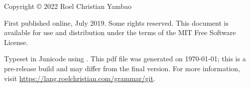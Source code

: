 \thispagestyle{empty}

    \vspace*{\fill}
{
\small

\noindent Copyright © 2022 Roel Christian Yambao \bigskip

\noindent First published online, July 2019. Some rights reserved. This document is available for use and distribution under the terms of the MIT Free Software License.

\medskip

\noindent Typeset in Junicode using \LuaLaTeX{}. This {\sc pdf} file was generated on \today{}; this is a pre-release build and may differ from the final version. For more information, visit \url{https://lang.roelchristian.com/grammar/git}.

}
